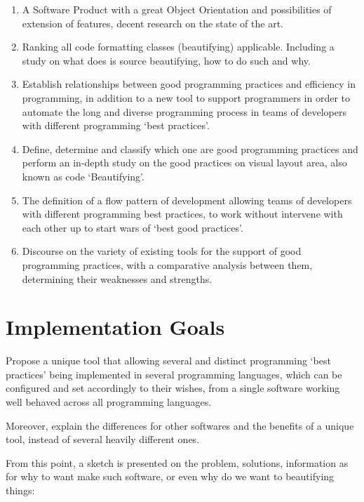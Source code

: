 \begin{enumerate}
    \item A Software Product with a great Object Orientation and possibilities of extension of features,
    decent research on the state of the art.

    \item Ranking all code formatting classes (beautifying) applicable.
    Including a study on what does is source beautifying,
    how to do such and why.

    \item Establish relationships between good programming practices and efficiency in programming,
    in addition to a new tool to support programmers in order to automate the long and diverse
    programming process in teams of developers with different programming `best practices'.

    \item Define, determine and classify which one are good programming practices and
    perform an in-depth study on the good practices on visual layout area,
    also known as code `Beautifying'.

    \item The definition of a flow pattern of development allowing teams of
    developers with different programming best practices,
    to work without intervene with each other up to start wars of `best good practices'.

    \item Discourse on the variety of existing tools for the support of good programming practices,
    with a comparative analysis between them,
    determining their weaknesses and strengths.
\end{enumerate}



\section{Implementation Goals}

Propose a unique tool that allowing several and distinct
programming `best practices' being implemented in several programming
languages, which can be configured and set accordingly to their wishes,
from a single software working well behaved across all programming languages.

Moreover, explain the differences for other softwares and the benefits
of a unique tool, instead of several heavily different ones.

From this point, a sketch is presented on the problem, solutions,
information as for why to want make such software, or even why do we want to
beautifying things:

